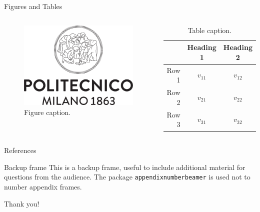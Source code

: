     \begin{frame}{Figures and Tables}
        \begin{columns}
                \begin{figure}
                    \centering
                    \includegraphics[scale=0.15]{../report/images/logo-polimi-transparent}
                    \caption{Figure caption.}
                    \label{fig:focuslogo}
                \end{figure}
                
                \begin{table}
                    \centering
                    \begin{tabular}{rcc}
                         & Heading 1 & Heading 2 \\\hline
                        Row 1 & \(v_{11}\) & \(v_{12}\) \\
                        Row 2 & \(v_{21}\) & \(v_{22}\) \\
                        Row 3 & \(v_{31}\) & \(v_{32}\) \\
                    \end{tabular}
                    \caption{Table caption.}
                    \label{tab:demo}
                \end{table}
        \end{columns}
    \end{frame}

    \appendix
    \begin{frame}{References}
        \nocite{*}
        
        
    \end{frame}
    
    \begin{frame}{Backup frame}
        This is a backup frame, useful to include additional material for questions from the audience.
        \vfill
        The package \texttt{appendixnumberbeamer} is used not to number appendix frames.
    \end{frame}

\begin{frame}
    Thank you!
\end{frame}